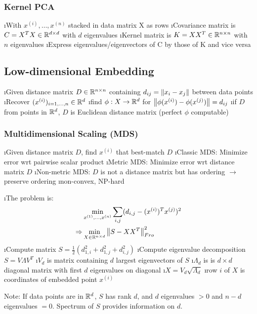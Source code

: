 \subsubsection{Kernel PCA}

\bi
\i With $x^{(i)},\ldots,x^{(n)}$ stacked in data matrix X as rows
\i Covariance matrix is $C=X^TX \in \mathbb{R}^{d\times d}$ with $d$ eigenvalues
\i Kernel matrix is $K = XX^T \in \mathbb{R}^{n\times n}$ with $n$ eigenvalues
\i Express eigenvalues/eigenvectors of C by those of K and vice versa
\ei

\subsection{Low-dimensional Embedding}

\bi
\i Given distance matrix $D \in \mathbb{R}^{n \times n}$ containing $d_{ij} = \left\lVert x_i-x_j\right\rVert$ between data points
\i Recover $(x^{(i)})_{i=1,\ldots,n} \in \mathbb{R}^d$
\i find $\phi: X \to \mathbb{R}^d$ for $\left\lVert\phi(x^{(i)}) - \phi(x^{(j)})\right\rVert = d_{ij}$
\i if $D$ from points in $\mathbb{R}^d$, $D$ is Euclidean distance matrix (perfect $\phi$ computable)
\ei

\subsubsection{Multidimensional Scaling (MDS)}

\bi
\i Given distance matrix $D$, find $x^{(i)}$ that best-match $D$
\i Classic MDS: Minimize error wrt pairwise scalar product
\i Metric MDS: Minimize error wrt distance matrix $D$
\i Non-metric MDS: $D$ is not a distance matrix but has ordering $\to$ preserve ordering
\i non-convex, NP-hard
\ei

\be
\i The problem is: \begin{align*}
&\min_{x^{(1)}, \ldots, x^{(n)}} \displaystyle\sum_{i,j} (d_{i,j} - (x^{(i)})^Tx^{(j)})^2 \\
\Rightarrow & \min_{X \in \mathbb{R}^{n \times d}} \left\lVert S-XX^T\right\rVert^2_{Fro} 
\end{align*}
\i Compute matrix $S = \frac{1}{2} (d^2_{1,i} + d^2_{1,j} + d^2_{i,j})$
\i Compute eigenvalue decomposition $S = V \Lambda V^T$
\i $V_d$ is matrix containing $d$ largest eigenvectors of $S$
\i $\Lambda_d$ is is $d \times d$ diagonal matrix with first $d$ eigenvalues on diagonal
\i $X = V_d \sqrt{\Lambda_d}$
\i row $i$ of $X$ is coordinates of embedded point $x^{(i)}$
\ee

Note: If data points are in $\mathbb{R}^d$, $S$ has rank $d$, and $d$ eigenvalues $>0$ and $n-d$ eigenvalues $=0$. Spectrum of $S$ provides information on $d$.

